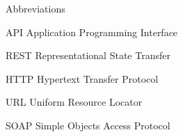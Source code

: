 
\begin{dictionary}{Abbreviations}
\item[API]	Application Programming Interface
\item[REST]	Representational State Transfer
\item[HTTP]	Hypertext Transfer Protocol
\item[URL] Uniform Resource Locator
\item[SOAP] Simple Objects Access Protocol
\end{dictionary}
